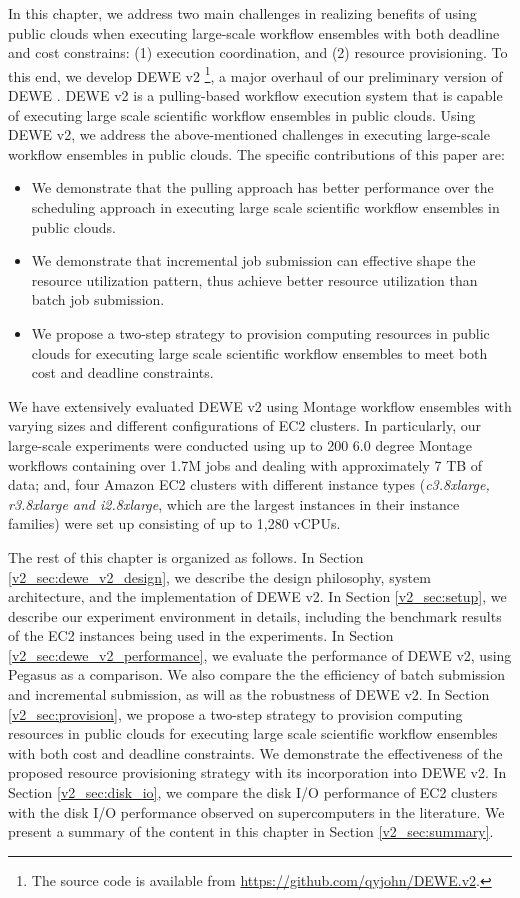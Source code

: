 In this chapter, we address two main challenges in realizing benefits of using public clouds when executing large-scale workflow ensembles with both deadline and cost constrains: (1) execution coordination, and (2) resource provisioning. To this end, we develop DEWE v2 \footnote{The source code is available from \url{https://github.com/qyjohn/DEWE.v2}.}, a major overhaul of our preliminary version of DEWE \cite{dewev1}. DEWE v2 is a pulling-based workflow execution system that is capable of executing large scale scientific workflow ensembles in public clouds. Using DEWE v2, we address the above-mentioned challenges in executing large-scale workflow ensembles in public clouds. The specific contributions of this paper are:


\begin{itemize}
  \item We demonstrate that the pulling approach has better performance over the scheduling approach in executing large scale scientific workflow ensembles in public clouds. 
  \item We demonstrate that incremental job submission can effective shape the resource utilization pattern, thus achieve better resource utilization than batch job submission. 
  \item We propose a two-step strategy to provision computing resources in public clouds for executing large scale scientific workflow ensembles to meet both cost and deadline constraints. 
\end{itemize}

We have extensively evaluated DEWE v2 using Montage workflow ensembles with varying sizes and different configurations of EC2 clusters. In particularly, our large-scale experiments were conducted using up to 200 6.0 degree Montage workflows containing over 1.7M jobs and dealing with approximately 7 TB of data; and, four Amazon EC2 clusters with different instance types (\emph{c3.8xlarge, r3.8xlarge and i2.8xlarge}, which are the largest instances in their instance families) were set up consisting of up to 1,280 vCPUs. 

The rest of this chapter is organized as follows. In Section \ref{v2_sec:dewe_v2_design}, we describe the design philosophy, system architecture, and the implementation of DEWE v2. In Section \ref{v2_sec:setup}, we describe our experiment environment in details, including the benchmark results of the EC2 instances being used in the experiments. In Section \ref{v2_sec:dewe_v2_performance}, we evaluate the performance of DEWE v2, using Pegasus as a comparison. We also compare the the efficiency of batch submission and incremental submission, as will as the robustness of DEWE v2. In Section \ref{v2_sec:provision}, we propose a two-step strategy to provision computing resources in public clouds for executing large scale scientific workflow ensembles with both cost and deadline constraints. We demonstrate the effectiveness of the proposed resource provisioning strategy with its incorporation into DEWE v2. In Section \ref{v2_sec:disk_io}, we compare the disk I/O performance of EC2 clusters with the disk I/O performance observed on supercomputers in the literature. We present a summary of the content in this chapter in Section \ref{v2_sec:summary}.


